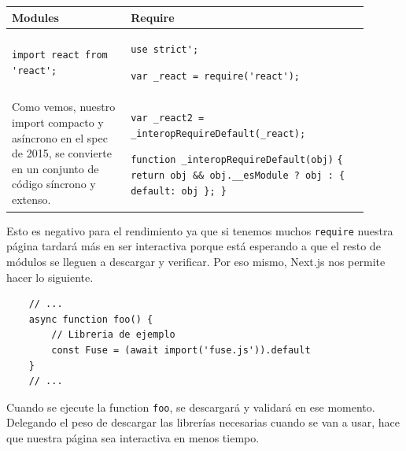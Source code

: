 \begin{center}
    \begin{table}[h!]
        \begin{tabular}{p{0.3\linewidth}  p{0.6\linewidth}}
            \textbf{Modules} & \textbf{Require} \\ \hline
                \verb|import react from 'react';|
            & 
\verb|use strict';|

\verb|var _react = require('react');|
             \\
            Como vemos, nuestro import compacto y asíncrono en el spec de 2015, se convierte en un conjunto de código síncrono y extenso. & 
\verb|var _react2 = _interopRequireDefault(_react);|

\verb|function _interopRequireDefault(obj)|
\verb|{ return obj && obj.__esModule ? obj : { default: obj }; }|

\\
        \end{tabular}
        \label{tab:EC6_output}
    \end{table}
\end{center}
Esto es negativo para el rendimiento ya que si tenemos muchos \verb|require| nuestra página tardará más en ser interactiva porque está esperando a que el resto de módulos se lleguen a descargar y verificar.
Por eso mismo, Next.js \cite{web:next.js} nos permite hacer lo siguiente.
\begin{lstlisting}
    // ...
    async function foo() {
        // Libreria de ejemplo
        const Fuse = (await import('fuse.js')).default
    }
    // ...
\end{lstlisting}
Cuando se ejecute la function \verb|foo|, se descargará y validará en ese momento. Delegando el peso de descargar las librerías necesarias cuando se van a usar, hace que nuestra página sea interactiva en menos tiempo.
